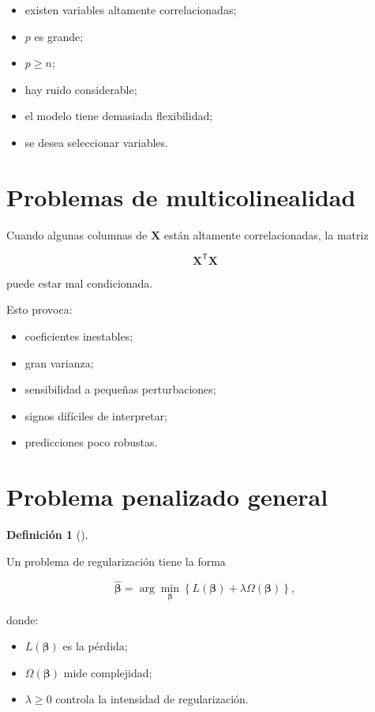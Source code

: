\documentclass[
  spanish,
  10.5pt,
  letterpaper,
  DIV=11,
  numbers=noendperiod,
  oneside,
  open=any]{scrreprt}
\providecommand{\tightlist}{%
  \setlength{\itemsep}{0pt}\setlength{\parskip}{0pt}}
\theoremstyle{definition}
\newtheorem{definition}{Definición}[chapter]
\theoremstyle{definition}
\theoremstyle{plain}
\theoremstyle{remark}
\begin{document}
\begin{itemize}
\tightlist
\item
  existen variables altamente correlacionadas;
\item
  \(p\) es grande;
\item
  \(p\geq n\);
\item
  hay ruido considerable;
\item
  el modelo tiene demasiada flexibilidad;
\item
  se desea seleccionar variables.
\end{itemize}

\section*{Problemas de
multicolinealidad}\label{problemas-de-multicolinealidad}


Cuando algunas columnas de \(\mathbf{X}\) están altamente
correlacionadas, la matriz

\[
\mathbf{X}^{\mathsf T}\mathbf{X}
\]

puede estar mal condicionada.

Esto provoca:

\begin{itemize}
\tightlist
\item
  coeficientes inestables;
\item
  gran varianza;
\item
  sensibilidad a pequeñas perturbaciones;
\item
  signos difíciles de interpretar;
\item
  predicciones poco robustas.
\end{itemize}

\section*{Problema penalizado
general}\label{problema-penalizado-general}


\begin{definition}[]\protect\hypertarget{def-regularizacion-general}{}\label{def-regularizacion-general}

Un problema de regularización tiene la forma

\[
\widehat{\boldsymbol{\beta}}
=
\arg\min_{\boldsymbol{\beta}}
\left\{
L(\boldsymbol{\beta})
+
\lambda
\Omega(\boldsymbol{\beta})
\right\},
\]

donde:

\begin{itemize}
\tightlist
\item
  \(L(\boldsymbol{\beta})\) es la pérdida;
\item
  \(\Omega(\boldsymbol{\beta})\) mide complejidad;
\item
  \(\lambda\geq 0\) controla la intensidad de regularización.
\end{itemize}

\end{definition}
\end{document}
